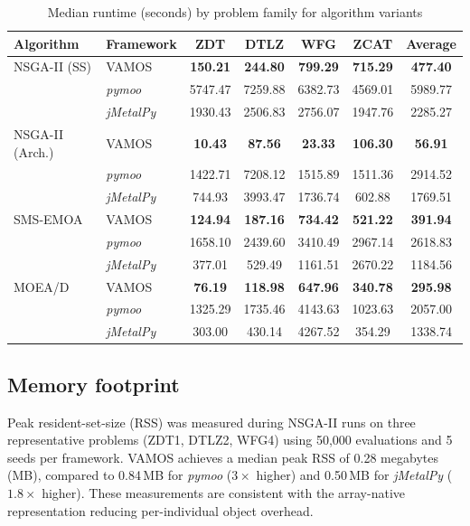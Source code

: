 \documentclass[final,5p,times,twocolumn]{elsarticle}
\newcommand{\VAMOS}{VAMOS}
\begin{document}
\begin{table}[htbp]
\centering
\scriptsize
\setlength{\tabcolsep}{3pt}
\caption{Median runtime (seconds) by problem family for algorithm variants}
\label{tab:frameworks_perf_variants}
\begin{tabular}{@{}llccccc@{}}
\toprule
\textbf{Algorithm} & \textbf{Framework} & \textbf{ZDT} & \textbf{DTLZ} & \textbf{WFG} & \textbf{ZCAT} & \textbf{Average} \\
\midrule
NSGA-II (SS) & VAMOS & \textbf{150.21} & \textbf{244.80} & \textbf{799.29} & \textbf{715.29} & \textbf{477.40} \\
 & \textit{pymoo}  & 5747.47 & 7259.88 & 6382.73 & 4569.01 & 5989.77 \\
 & \textit{jMetalPy} & 1930.43 & 2506.83 & 2756.07 & 1947.76 & 2285.27 \\
\midrule
NSGA-II (Arch.) & VAMOS & \textbf{10.43} & \textbf{87.56} & \textbf{23.33} & \textbf{106.30} & \textbf{56.91} \\
 & \textit{pymoo}  & 1422.71 & 7208.12 & 1515.89 & 1511.36 & 2914.52 \\
 & \textit{jMetalPy} & 744.93 & 3993.47 & 1736.74 & 602.88 & 1769.51 \\
\midrule
SMS-EMOA & VAMOS & \textbf{124.94} & \textbf{187.16} & \textbf{734.42} & \textbf{521.22} & \textbf{391.94} \\
 & \textit{pymoo}  & 1658.10 & 2439.60 & 3410.49 & 2967.14 & 2618.83 \\
 & \textit{jMetalPy} & 377.01 & 529.49 & 1161.51 & 2670.22 & 1184.56 \\
\midrule
MOEA/D & VAMOS & \textbf{76.19} & \textbf{118.98} & \textbf{647.96} & \textbf{340.78} & \textbf{295.98} \\
 & \textit{pymoo}  & 1325.29 & 1735.46 & 4143.63 & 1023.63 & 2057.00 \\
 & \textit{jMetalPy} & 303.00 & 430.14 & 4267.52 & 354.29 & 1338.74 \\
\bottomrule
\end{tabular}
\end{table}

\subsection{Memory footprint}

Peak resident-set-size (RSS) was measured during NSGA-II runs on three representative problems (ZDT1, DTLZ2, WFG4) using 50{,}000 evaluations and 5 seeds per framework. \VAMOS{} achieves a median peak RSS of 0.28 megabytes (MB), compared to 0.84\,MB for \textit{pymoo}  ($3\times$ higher) and 0.50\,MB for \textit{jMetalPy} ($1.8\times$ higher). These measurements are consistent with the array-native representation reducing per-individual object overhead.
\end{document}
